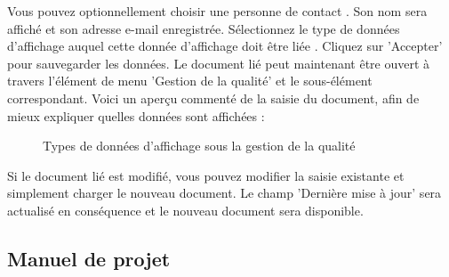 Vous pouvez optionnellement choisir une personne de contact . Son nom sera affiché et son adresse e-mail enregistrée. Sélectionnez le type de données d'affichage auquel cette donnée d'affichage doit être liée . Cliquez sur 'Accepter' pour sauvegarder les données. Le document lié peut maintenant être ouvert à travers l'élément de menu 'Gestion de la qualité' et le sous-élément correspondant. Voici un aperçu commenté de la saisie du document, afin de mieux expliquer quelles données sont affichées :

\begin{figure}[H]
\caption{Types de données d'affichage sous la gestion de la qualité}
\end{figure}

Si le document lié est modifié, vous pouvez modifier la saisie existante et simplement charger le nouveau document. Le champ 'Dernière mise à jour' sera actualisé en conséquence et le nouveau document sera disponible.

\subsection{Manuel de projet}

